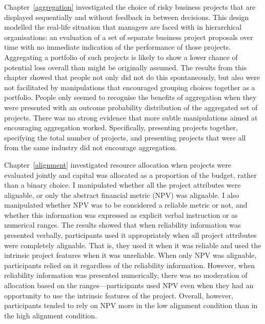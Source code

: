 \documentclass[a4paper, nobind, dvipsnames]{templates/ociamthesis}
\theoremstyle{definition}
\theoremstyle{definition}
\theoremstyle{definition}
\theoremstyle{definition}
\theoremstyle{remark}
\begin{document}
Chapter~\ref{aggregation} investigated the choice of risky business projects
that are displayed sequentially and without feedback in between decisions. This
design modelled the real-life situation that managers are faced with in
hierarchical organisations: an evaluation of a set of separate business project
proposals over time with no immediate indication of the performance of those
projects. Aggregating a portfolio of such projects is likely to show a lower
chance of potential loss overall than might be originally assumed. The results
from this chapter showed that people not only did not do this spontaneously, but
also were not facilitated by manipulations that encouraged grouping choices
together as a portfolio. People only seemed to recognise the benefits of
aggregation when they were presented with an outcome probability distribution of
the aggregated set of projects. There was no strong evidence that more subtle
manipulations aimed at encouraging aggregation worked. Specifically, presenting
projects together, specifying the total number of projects, and presenting
projects that were all from the same industry did not encourage aggregation.

Chapter~\ref{alignment} investigated resource allocation when projects were
evaluated jointly and capital was allocated as a proportion of the budget,
rather than a binary choice. I manipulated whether all the project attributes
were alignable, or only the abstract financial metric (NPV) was alignable. I
also manipulated whether NPV was to be considered a reliable metric or not, and
whether this information was expressed as explicit verbal instruction or as
numerical ranges. The results showed that when reliability information was
presented verbally, participants used it appropriately when all project
attributes were completely alignable. That is, they used it when it was reliable
and used the intrinsic project features when it was unreliable. When only NPV
was alignable, participants relied on it regardless of the reliability
information. However, when reliability information was presented numerically,
there was no moderation of allocation based on the ranges---participants used
NPV even when they had an opportunity to use the intrinsic features of the
project. Overall, however, participants tended to rely on NPV more in the low
alignment condition than in the high alignment condition.
\end{document}
